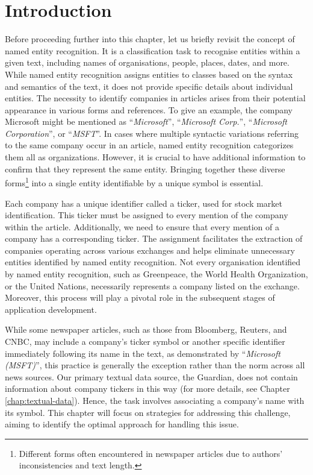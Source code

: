 \section{Introduction}
\label{sec:introduction}
Before proceeding further into this chapter, let us briefly revisit the concept of named entity recognition. It is a classification task to recognise entities within a given text, including names of organisations, people, places, dates, and more. While named entity recognition assigns entities to classes based on the syntax and semantics of the text, it does not provide specific details about individual entities. The necessity to identify companies in articles arises from their potential appearance in various forms and references. To give an example, the company Microsoft might be mentioned as ``\textit{Microsoft}'', ``\textit{Microsoft Corp.}'', ``\textit{Microsoft Corporation}'', or ``\textit{MSFT}''. In cases where multiple syntactic variations referring to the same company occur in an article, named entity recognition categorizes them all as organizations. However, it is crucial to have additional information to confirm that they represent the same entity. Bringing together these diverse forms\footnote{Different forms often encountered in newspaper articles due to authors' inconsistencies and text length.} into a single entity identifiable by a unique symbol is essential.

Each company has a unique identifier called a ticker, used for stock market identification. This ticker must be assigned to every mention of the company within the article. Additionally, we need to ensure that every mention of a company has a corresponding ticker. The assignment facilitates the extraction of companies operating across various exchanges and helps eliminate unnecessary entities identified by named entity recognition. Not every organisation identified by named entity recognition, such as Greenpeace, the World Health Organization, or the United Nations, necessarily represents a company listed on the exchange. Moreover, this process will play a pivotal role in the subsequent stages of application development.

While some newspaper articles, such as those from Bloomberg, Reuters, and CNBC, may include a company's ticker symbol or another specific identifier immediately following its name in the text, as demonstrated by ``\textit{Microsoft (MSFT)}'', this practice is generally the exception rather than the norm across all news sources. Our primary textual data source, the Guardian, does not contain information about company tickers in this way (for more details, see Chapter \ref{chap:textual-data}). Hence, the task involves associating a company's name with its symbol. This chapter will focus on strategies for addressing this challenge, aiming to identify the optimal approach for handling this issue.

